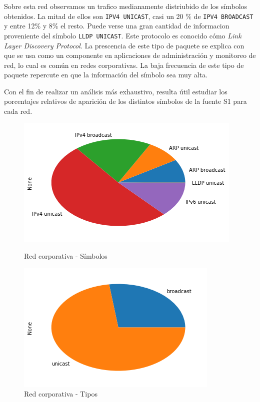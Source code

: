 Sobre esta red observamos un trafico medianamente distriubido de los símbolos obtenidos. La mitad de ellos son \texttt{IPV4 UNICAST}, casi un 20 \% de \texttt{IPV4 BROADCAST} y entre 12\% y 8\% el resto. Puede verse una gran cantidad de informacion proveniente del símbolo \texttt{LLDP UNICAST}. Este protocolo es conocido cómo \textit{Link Layer Discovery Protocol}. La prescencia de este tipo de paquete se explica con que se usa como un componente en aplicaciones de administración y monitoreo de red, lo cual es común en redes corporativas. La baja frecuencia de este tipo de paquete repercute en que la información del símbolo sea muy alta.

Con el fin de realizar un análisis más exhaustivo, resulta útil estudiar los porcentajes relativos de aparición de los distintos símbolos de la fuente S1 para cada red.

\begin{figure}[H]
	\begin{minipage}{0.49\textwidth}
		\centering
		\includegraphics[width=\linewidth]{imagenes/despegar_torta_simbolos}
		\caption{Red corporativa - Símbolos}
		\label{despe_torta_simb}
	\end{minipage}
	\begin{minipage}{0.49\textwidth}
		\centering
		\includegraphics[width=\linewidth]{imagenes/despegar_torta_tipos}
		\caption{Red corporativa - Tipos}
		\label{despe_torta_tipos}
	\end{minipage}
\end{figure}

